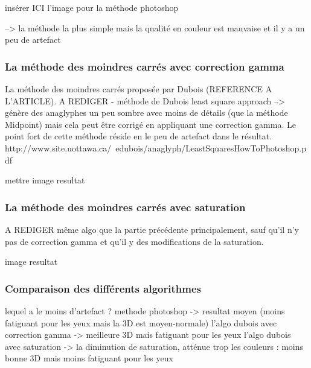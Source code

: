 	 insérer ICI l'image pour la méthode photoshop

	--> la méthode la plus simple mais la qualité en couleur est mauvaise et il y a un peu de artefact
\subsubsection{La méthode des moindres carrés avec correction gamma}

	La méthode des moindres carrés proposée par Dubois (REFERENCE A L'ARTICLE).
A REDIGER
- méthode de Dubois least square approach
--> génère des anaglyphes un peu sombre avec moins de détails (que la méthode Midpoint) mais cela peut être corrigé en appliquant une correction gamma. Le point fort de cette méthode réside en le peu de artefact dans le résultat.
http://www.site.uottawa.ca/~edubois/anaglyph/LeastSquaresHowToPhotoshop.pdf

mettre image resultat

\subsubsection{La méthode des moindres carrés avec saturation}
A REDIGER
même algo que la partie précédente principalement, sauf qu'il n'y pas de correction gamma et qu'il y des modifications de la saturation.

image resultat

\subsubsection{Comparaison des différents algorithmes}

lequel a le moins d'artefact ?
methode photoshop -> resultat moyen (moins fatiguant pour les yeux mais la 3D est moyen-normale)
l'algo dubois avec correction gamma -> meilleure 3D mais fatiguant pour les yeux
l'algo dubois avec saturation -> la diminution de saturation, atténue trop les couleurs : moins bonne 3D mais moins fatiguant pour les yeux 





